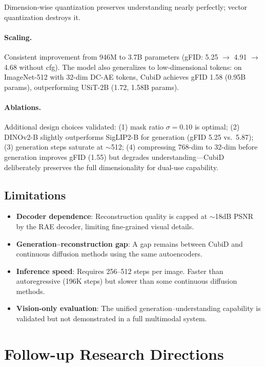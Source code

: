 \documentclass[11pt]{article}
\begin{document}
Dimension-wise quantization preserves understanding nearly perfectly; vector quantization destroys it.

\paragraph{Scaling.}
Consistent improvement from 946M to 3.7B parameters (gFID: 5.25 $\rightarrow$ 4.91 $\rightarrow$ 4.68 without cfg).
The model also generalizes to low-dimensional tokens: on ImageNet-512 with 32-dim DC-AE tokens, CubiD achieves gFID 1.58 (0.95B params), outperforming USiT-2B (1.72, 1.58B params).

\paragraph{Ablations.}
Additional design choices validated: (1) mask ratio $\sigma\!=\!0.10$ is optimal; (2) DINOv2-B slightly outperforms SigLIP2-B for generation (gFID 5.25 vs.\ 5.87); (3) generation steps saturate at $\sim$512; (4) compressing 768-dim to 32-dim before generation improves gFID (1.55) but degrades understanding---CubiD deliberately preserves the full dimensionality for dual-use capability.

\subsection{Limitations}
\begin{itemize}
    \item \textbf{Decoder dependence}: Reconstruction quality is capped at $\sim$18dB PSNR by the RAE decoder, limiting fine-grained visual details.
    \item \textbf{Generation--reconstruction gap}: A gap remains between CubiD and continuous diffusion methods using the same autoencoders.
    \item \textbf{Inference speed}: Requires 256--512 steps per image. Faster than autoregressive (196K steps) but slower than some continuous diffusion methods.
    \item \textbf{Vision-only evaluation}: The unified generation--understanding capability is validated but not demonstrated in a full multimodal system.
\end{itemize}

\section{Follow-up Research Directions}
\end{document}
